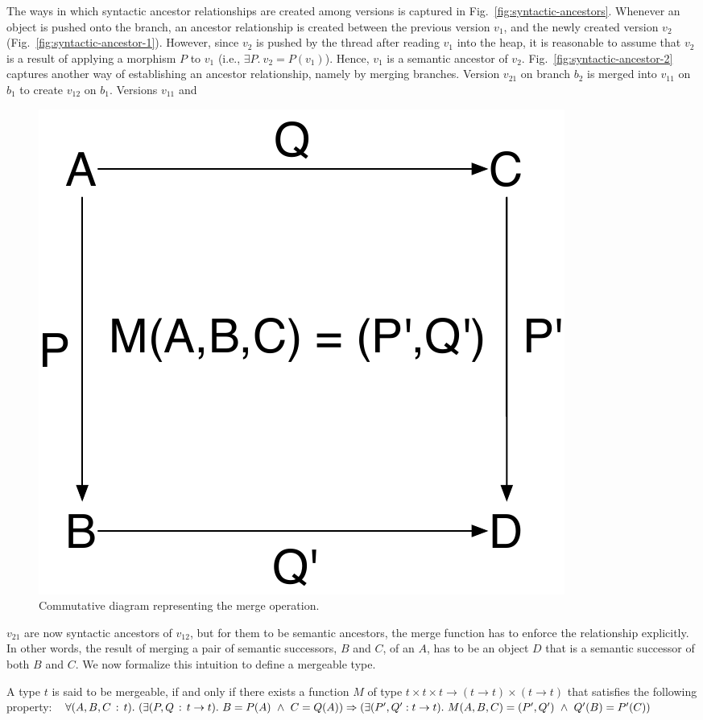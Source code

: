 The ways in which syntactic ancestor relationships are created among
versions is captured in Fig.~\ref{fig:syntactic-ancestors}. Whenever an
object is pushed onto the branch, an ancestor relationship is created
between the previous version $v_1$, and the newly created version
$v_2$ (Fig.~\ref{fig:syntactic-ancestor-1}). However, since $v_2$ is
pushed by the thread after reading $v_1$ into the heap, it is
reasonable to assume that $v_2$ is a result of applying a morphism $P$
to $v_1$ (i.e., $\exists P.~v_2 = P(v_1)$).  Hence, $v_1$ is a
semantic ancestor of $v_2$.  Fig.~\ref{fig:syntactic-ancestor-2}
captures another way of establishing an ancestor relationship, namely by
merging branches. Version $v_{21}$ on branch $b_2$ is merged into
$v_{11}$ on $b_1$ to create $v_{12}$ on $b_1$. Versions $v_{11}$ and
\begin{figure}
\centering
\includegraphics[scale=0.35]{Figures/pushouts}
\caption{Commutative diagram representing the merge operation.}
\label{fig:pushouts}
\end{figure}
$v_{21}$ are now syntactic ancestors of $v_{12}$, but for them to be
semantic ancestors, the merge function has to enforce the relationship
explicitly. In other words, the result of merging  a pair of
semantic successors, $B$ and $C$, of an $A$, has to be an object $D$
that is a semantic successor of both $B$ and $C$. We now formalize
this intuition to define a mergeable type.
\begin{definition} 
\label{def:mergeable-type}
A type $t$ is said to be mergeable, if and only if there exists a
function $M$ of type $t \times t \times t \rightarrow (t \rightarrow
t)\times(t \rightarrow t)$ that satisfies the following property:
$\forall (A, B, C\,:\,t).~ (\exists (P,Q\,:\, t \rightarrow t).~ B =
P(A) ~\wedge~ C = Q(A)) \Rightarrow (\exists (P',Q': t\rightarrow
t).~M(A,B,C) = (P',Q') ~\wedge~  Q'(B) = P'(C))$
\end{definition}
